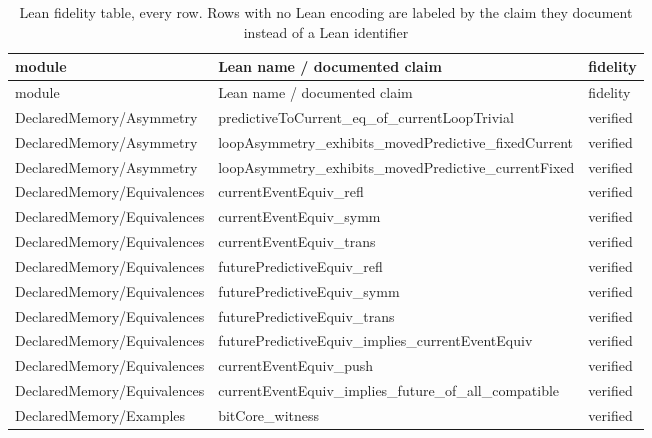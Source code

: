 \begin{longtable}{>{\raggedright\arraybackslash}p{3.6cm}>{\raggedright\arraybackslash}p{8.4cm}p{2.9cm}}
\caption{Lean fidelity table, every row. Rows with no Lean encoding are labeled by the claim they document instead of a Lean identifier}\label{tab:lean-fidelity-full} \\
\toprule
module & Lean name / documented claim & fidelity \\
\midrule
\endfirsthead
\toprule
module & Lean name / documented claim & fidelity \\
\midrule
\endhead
\bottomrule
\endfoot
DeclaredMemory/\allowbreak{}Asymmetry & predictiveToCurrent\_\allowbreak{}eq\_\allowbreak{}of\_\allowbreak{}currentLoopTrivial & verified \\
DeclaredMemory/\allowbreak{}Asymmetry & loopAsymmetry\_\allowbreak{}exhibits\_\allowbreak{}movedPredictive\_\allowbreak{}fixedCurrent & verified \\
DeclaredMemory/\allowbreak{}Asymmetry & loopAsymmetry\_\allowbreak{}exhibits\_\allowbreak{}movedPredictive\_\allowbreak{}currentFixed & verified \\
DeclaredMemory/\allowbreak{}Equivalences & currentEventEquiv\_\allowbreak{}refl & verified \\
DeclaredMemory/\allowbreak{}Equivalences & currentEventEquiv\_\allowbreak{}symm & verified \\
DeclaredMemory/\allowbreak{}Equivalences & currentEventEquiv\_\allowbreak{}trans & verified \\
DeclaredMemory/\allowbreak{}Equivalences & futurePredictiveEquiv\_\allowbreak{}refl & verified \\
DeclaredMemory/\allowbreak{}Equivalences & futurePredictiveEquiv\_\allowbreak{}symm & verified \\
DeclaredMemory/\allowbreak{}Equivalences & futurePredictiveEquiv\_\allowbreak{}trans & verified \\
DeclaredMemory/\allowbreak{}Equivalences & futurePredictiveEquiv\_\allowbreak{}implies\_\allowbreak{}currentEventEquiv & verified \\
DeclaredMemory/\allowbreak{}Equivalences & currentEventEquiv\_\allowbreak{}push & verified \\
DeclaredMemory/\allowbreak{}Equivalences & currentEventEquiv\_\allowbreak{}implies\_\allowbreak{}future\_\allowbreak{}of\_\allowbreak{}all\_\allowbreak{}compatible & verified \\
DeclaredMemory/\allowbreak{}Examples & bitCore\_\allowbreak{}witness & verified \\

\end{longtable}
